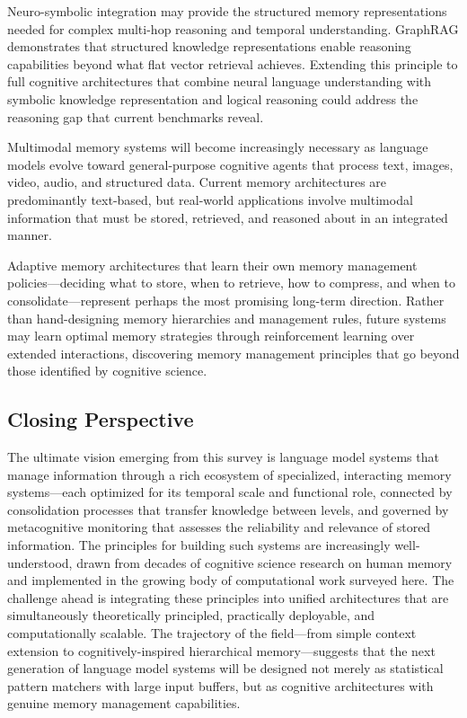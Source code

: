 \documentclass[11pt,letterpaper]{article}
\begin{document}
Neuro-symbolic integration may provide the structured memory representations needed for complex multi-hop reasoning and temporal understanding. GraphRAG demonstrates that structured knowledge representations enable reasoning capabilities beyond what flat vector retrieval achieves. Extending this principle to full cognitive architectures that combine neural language understanding with symbolic knowledge representation and logical reasoning could address the reasoning gap that current benchmarks reveal.

Multimodal memory systems will become increasingly necessary as language models evolve toward general-purpose cognitive agents that process text, images, video, audio, and structured data. Current memory architectures are predominantly text-based, but real-world applications involve multimodal information that must be stored, retrieved, and reasoned about in an integrated manner.

Adaptive memory architectures that learn their own memory management policies---deciding what to store, when to retrieve, how to compress, and when to consolidate---represent perhaps the most promising long-term direction. Rather than hand-designing memory hierarchies and management rules, future systems may learn optimal memory strategies through reinforcement learning over extended interactions, discovering memory management principles that go beyond those identified by cognitive science.

\subsection{Closing Perspective}

The ultimate vision emerging from this survey is language model systems that manage information through a rich ecosystem of specialized, interacting memory systems---each optimized for its temporal scale and functional role, connected by consolidation processes that transfer knowledge between levels, and governed by metacognitive monitoring that assesses the reliability and relevance of stored information. The principles for building such systems are increasingly well-understood, drawn from decades of cognitive science research on human memory and implemented in the growing body of computational work surveyed here. The challenge ahead is integrating these principles into unified architectures that are simultaneously theoretically principled, practically deployable, and computationally scalable. The trajectory of the field---from simple context extension to cognitively-inspired hierarchical memory---suggests that the next generation of language model systems will be designed not merely as statistical pattern matchers with large input buffers, but as cognitive architectures with genuine memory management capabilities.



\end{document}
